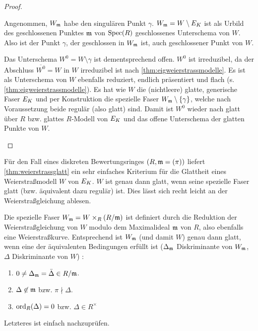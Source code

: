 \documentclass[german, bibliography=totoc]{scrreprt}
\begin{document}
\begin{Lemma}
\begin{proof}
\begin{enumerate}[label=(\alph*)]
      Angenommen, $W_{\mathfrak{m}}$ habe den singulären Punkt $\gamma$.
      $W_{\mathfrak{m}}=W\setminus E_{K}$ ist als Urbild des geschlossenen Punktes
      $\mathfrak{m}$ von $\operatorname{Spec}(R)$ geschlossenes Unterschema von $W$.
      Also ist der Punkt $\gamma$, der geschlossen in $W_{\mathfrak{m}}$ ist, auch
      geschlossener Punkt von $W$.
      
      Das Unterschema $W^0=W\setminus\gamma$ ist dementsprechend offen.
      $W^0$ ist irreduzibel, da der Abschluss $\overline{W^0}=W$ in
      $W$ irreduzibel ist nach \ref{thm:eigweierstrassmodelle}.
      Es ist als Unterschema von $W$ ebenfalls reduziert, endlich
      präsentiert und flach (s. \ref{thm:eigweierstrassmodelle}).
      Es hat wie $W$ die (nichtleere) glatte, generische Faser $E_{K}$ und
      per Konstruktion die spezielle Faser $W_{\mathfrak{m}}\setminus\{\gamma\}$,
      welche nach Voraussetzung beide regulär (also glatt) sind.
      Damit ist $W^0$ wieder nach \cite[8.5, Proposition 17]{bosch}
      glatt über $R$ bzw. glattes $R$-Modell von $E_{K}$ und das offene
      Unterschema der glatten Punkte von $W$.
    \end{enumerate}
  \end{proof}
\end{Lemma}

\begin{Bemerkung}\label{thm:weierstraßmodellglatt}
  Für den Fall eines diskreten Bewertungsringes $(R,\mathfrak{m}=(\pi))$ liefert
  \ref{thm:weierstrassglatt} ein sehr einfaches Kriterium für die
  Glattheit eines Weierstraßmodell $W$ von $E_{K}$.
  $W$ ist genau dann glatt, wenn seine spezielle Faser glatt
  (bzw. äquivalent dazu regulär) ist.
  Dies lässt sich recht leicht an der Weierstraßgleichung ablesen.
  
  Die spezielle Faser $W_{\mathfrak{m}}=W\times_R (R/\mathfrak{m})$ ist definiert
  durch die Reduktion der Weierstraßgleichung von $W$ modulo dem
  Maximalideal $\mathfrak{m}$ von $R$, also ebenfalls eine Weierstraßkurve.
  Entsprechend ist $W_{\mathfrak{m}}$ (und damit $W$) genau dann glatt, wenn
  eine der äquivalenten Bedingungen erfüllt ist
  ($\Delta_{\mathfrak{m}}$ Diskriminante von $W_{\mathfrak{m}}$,
  $\Delta$ Diskriminante von $W$)
  \cite[Proposition VII.5.1 (a)]{silverman}:
  \begin{enumerate}[label=(\roman*)]
  \item $0\neq\Delta_{\mathfrak{m}}=\bar\Delta\in R/\mathfrak{m}$.
  \item $\Delta\not\in\mathfrak{m}$ bzw. $\pi\nmid\Delta$.
  \item $\operatorname{ord}_R(\Delta)=0$ bzw. $\Delta\in R^\times$
  \end{enumerate}
  Letzteres ist einfach nachzuprüfen.
\end{Bemerkung}
\end{document}
